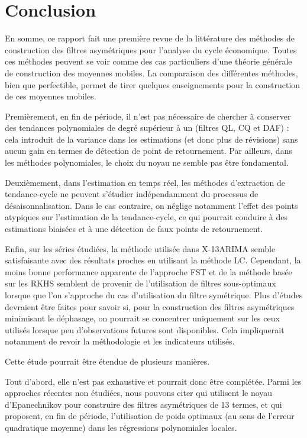 \documentclass[
  11pt,
  french,
  a4paper]{article}
\newcommand\1{\mathds{1}}
\begin{document}
\newpage

\hypertarget{conclusion}{%
\section*{Conclusion}\label{conclusion}}

En somme, ce rapport fait une première revue de la littérature des méthodes de construction des filtres asymétriques pour l'analyse du cycle économique.
Toutes ces méthodes peuvent se voir comme des cas particuliers d'une théorie générale de construction des moyennes mobiles.
La comparaison des différentes méthodes, bien que perfectible, permet de tirer quelques enseignements pour la construction de ces moyennes mobiles.

Premièrement, en fin de période, il n'est pas nécessaire de chercher à conserver des tendances polynomiales de degré supérieur à un (filtres QL, CQ et DAF) : cela introduit de la variance dans les estimations (et donc plus de révisions) sans aucun gain en termes de détection de point de retournement.
Par ailleurs, dans les méthodes polynomiales, le choix du noyau ne semble pas être fondamental.

Deuxièmement, dans l'estimation en temps réel, les méthodes d'extraction de tendance-cycle ne peuvent s'étudier indépendamment du processus de désaisonnalisation.
Dans le cas contraire, on néglige notamment l'effet des points atypiques sur l'estimation de la tendance-cycle, ce qui pourrait conduire à des estimations biaisées et à une détection de faux points de retournement.

Enfin, sur les séries étudiées, la méthode utilisée dans X-13ARIMA semble satisfaisante avec des résultats proches en utilisant la méthode LC.
Cependant, la moins bonne performance apparente de l'approche FST et de la méthode basée sur les RKHS semblent de provenir de l'utilisation de filtres sous-optimaux lorsque que l'on s'approche du cas d'utilisation du filtre symétrique.
Plus d'études devraient être faites pour savoir si, pour la construction des filtres asymétriques minimisant le déphasage, on pourrait se concentrer uniquement sur les ceux utilisés lorsque peu d'observations futures sont disponibles.
Cela impliquerait notamment de revoir la méthodologie et les indicateurs utilisés.

Cette étude pourrait être étendue de plusieurs manières.

Tout d'abord, elle n'est pas exhaustive et pourrait donc être complétée.
Parmi les approches récentes non étudiées, nous pouvons citer \textcite{vasyechko2014new} qui utilisent le noyau d'Epanechnikov pour construire des filtres asymétriques de 13 termes, et \textcite{FengSchafer2021} qui proposent, en fin de période, l'utilisation de poids optimaux (au sens de l'erreur quadratique moyenne) dans les régressions polynomiales locales.
\end{document}
